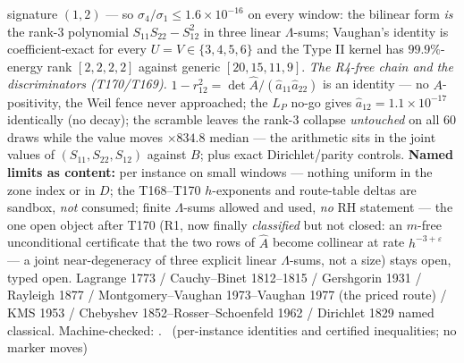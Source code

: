 signature $(1,2)$ --- so $\sigma_4/\sigma_1\le1.6\times10^{-16}$ on every
window: the bilinear form \emph{is} the rank-3 polynomial
$S_{11}S_{22}-S_{12}^2$ in three linear $\Lambda$-sums; Vaughan's
identity is coefficient-exact for every $U=V\in\{3,4,5,6\}$ and the Type
II kernel has $99.9\%$-energy rank $[2,2,2,2]$ against generic
$[20,15,11,9]$.
\emph{The R4-free chain and the discriminators (T170/T169).}
$1-r_{12}^2=\det\hat A/(\hat a_{11}\hat a_{22})$ is an identity --- no
$A$-positivity, the Weil fence never approached; the $L_P$ no-go gives
$\hat a_{12}=1.1\times10^{-17}$ identically (no decay); the scramble
leaves the rank-3 collapse \emph{untouched} on all $60$ draws while the
value moves $\times834.8$ median --- the arithmetic sits in the joint
values of $(S_{11},S_{22},S_{12})$ against $B$; plus exact
Dirichlet/parity controls.
\textbf{Named limits as content:} per instance on small windows ---
nothing uniform in the zone index or in $D$; the T168--T170 $h$-exponents
and route-table deltas are sandbox, \emph{not} consumed; finite
$\Lambda$-sums allowed and used, \emph{no} RH statement --- the one open
object after T170 (R1, now finally \emph{classified} but not closed: an
$m$-free unconditional certificate that the two rows of $\hat A$ become
collinear at rate $h^{-3+\varepsilon}$ --- a joint near-degeneracy of
three explicit linear $\Lambda$-sums, not a size) stays open, typed open.
Lagrange 1773 / Cauchy--Binet 1812--1815 / Gershgorin 1931 / Rayleigh 1877
/ Montgomery--Vaughan 1973--Vaughan 1977 (the priced route) / KMS 1953 /
Chebyshev 1852--Rosser--Schoenfeld 1962 / Dirichlet 1829 named classical.
Machine-checked:
.
\mE\ (per-instance identities and certified inequalities; no marker moves)


